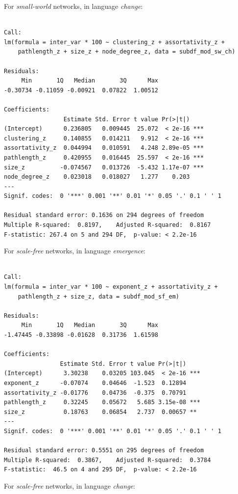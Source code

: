 \documentclass[
]{article}
\begin{document}
For \emph{small-world} networks, in language \emph{change}:

\begin{verbatim}

Call:
lm(formula = inter_var * 100 ~ clustering_z + assortativity_z + 
    pathlength_z + size_z + node_degree_z, data = subdf_mod_sw_ch)

Residuals:
     Min       1Q   Median       3Q      Max 
-0.30734 -0.11059 -0.00921  0.07822  1.00512 

Coefficients:
                 Estimate Std. Error t value Pr(>|t|)    
(Intercept)      0.236805   0.009445  25.072  < 2e-16 ***
clustering_z     0.140855   0.014211   9.912  < 2e-16 ***
assortativity_z  0.044994   0.010591   4.248 2.89e-05 ***
pathlength_z     0.420955   0.016445  25.597  < 2e-16 ***
size_z          -0.074567   0.013726  -5.432 1.17e-07 ***
node_degree_z    0.023018   0.018027   1.277    0.203    
---
Signif. codes:  0 '***' 0.001 '**' 0.01 '*' 0.05 '.' 0.1 ' ' 1

Residual standard error: 0.1636 on 294 degrees of freedom
Multiple R-squared:  0.8197,    Adjusted R-squared:  0.8167 
F-statistic: 267.4 on 5 and 294 DF,  p-value: < 2.2e-16
\end{verbatim}

For \emph{scale-free} networks, in language \emph{emergence}:

\begin{verbatim}

Call:
lm(formula = inter_var * 100 ~ exponent_z + assortativity_z + 
    pathlength_z + size_z, data = subdf_mod_sf_em)

Residuals:
     Min       1Q   Median       3Q      Max 
-1.47445 -0.33898 -0.01628  0.31736  1.61598 

Coefficients:
                Estimate Std. Error t value Pr(>|t|)    
(Intercept)      3.30238    0.03205 103.045  < 2e-16 ***
exponent_z      -0.07074    0.04646  -1.523  0.12894    
assortativity_z -0.01776    0.04736  -0.375  0.70791    
pathlength_z     0.32245    0.05672   5.685 3.15e-08 ***
size_z           0.18763    0.06854   2.737  0.00657 ** 
---
Signif. codes:  0 '***' 0.001 '**' 0.01 '*' 0.05 '.' 0.1 ' ' 1

Residual standard error: 0.5551 on 295 degrees of freedom
Multiple R-squared:  0.3867,    Adjusted R-squared:  0.3784 
F-statistic:  46.5 on 4 and 295 DF,  p-value: < 2.2e-16
\end{verbatim}

For \emph{scale-free} networks, in language \emph{change}:
\end{document}

